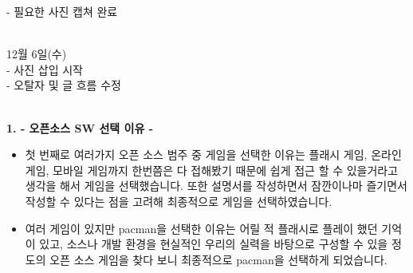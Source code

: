 \documentclass{article}
\begin{document}
- 필요한 사진 캡쳐 완료\\\

12월 6일(수)\\

- 사진 삽입 시작\\

- 오탈자 및 글 흐름 수정\\\

\newpage
\flushleft
\textbf{1. - 오픈소스 SW 선택 이유 -}
\begin{itemize}

\item 첫 번째로 여러가지 오픈 소스 범주 중 게임을 선택한 이유는 플래시 게임, 온라인 게임, 모바일 게임까지 한번쯤은 다 접해봤기 때문에 쉽게 접근 할 수 있을거라고 생각을 해서 게임을 선택했습니다. 또한 설명서를 작성하면서 잠깐이나마 즐기면서 작성할 수 있다는 점을 고려해 최종적으로 게임을 선택하였습니다.\\

\item 여러 게임이 있지만 pacman을 선택한 이유는 어릴 적 플래시로 플레이 했던 기억이 있고, 소스나 개발 환경을 현실적인 우리의 실력을 바탕으로 구성할 수 있을 정도의 오픈 소스 게임을 찾다 보니 최종적으로 pacman을 선택하게 되었습니다.

\end{itemize}
\end{document}
